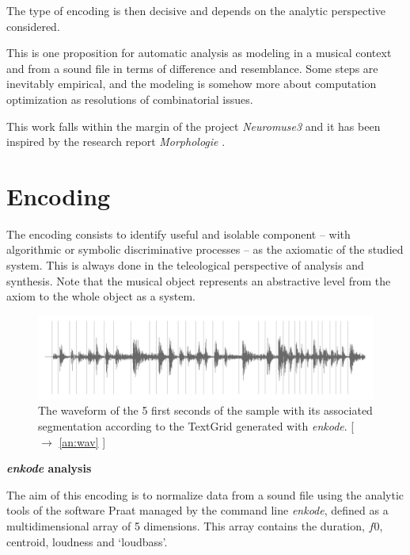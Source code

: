 The type of encoding is then decisive and depends on the analytic perspective considered.

\bigskip

This is one proposition for automatic analysis as modeling in a musical context and from a sound file in terms of difference and resemblance. Some steps are inevitably empirical, and the modeling is somehow more about computation optimization as resolutions of combinatorial issues.

This work falls within the margin of the project \textsl{Neuromuse3} and it has been inspired by the research report \textit{Morphologie} \citep{mp}.

\section{Encoding}

The encoding consists to identify useful and isolable component -- with algorithmic or symbolic discriminative processes -- as the axiomatic of the studied system. This is always done in the teleological perspective of analysis and synthesis. 
Note that the musical object represents an abstractive level from the axiom to the whole object as a system.

\begin{figure}[!hbt]
	\begin{center}
		\includegraphics[width=\columnwidth]{img/3790}
		\caption{The waveform of the 5 first seconds of the sample with its associated segmentation according to the TextGrid generated 
		with
		 \textsl{enkode}. [ $\rightarrow$ \ref{an:wav} ]}
		\label{fig:wave}
	\end{center}
\end{figure}
	
\textbf{\textsl{enkode} analysis}
\smallskip

The aim of this encoding is to normalize data from a sound file using the analytic tools of the software Praat managed by the command line \textsl{enkode}, defined as a multidimensional array of 5 dimensions. This array contains the duration, $f0$, centroid, loudness and `loudbass'.

